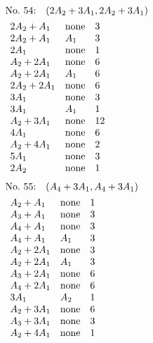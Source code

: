 \begin{align*}
&\hbox to 4cm {\textrm{No.~54:}\quad$(2A_{2}+3A_{1}, 2A_{2}+3A_{1})$\hss}\\ 
&\begin{array}{lll}
2A_{2}+A_{1} & \none & 3\\
2A_{2}+A_{1} & A_{1} & 3\\
2A_{1} & \none & 1\\
A_{2}+2A_{1} & \none & 6\\
A_{2}+2A_{1} & A_{1} & 6\\
2A_{2}+2A_{1} & \none & 6\\
3A_{1} & \none & 3\\
3A_{1} & A_{1} & 1\\
A_{2}+3A_{1} & \none & 12\\
4A_{1} & \none & 6\\
A_{2}+4A_{1} & \none & 2\\
5A_{1} & \none & 3\\
2A_{2} & \none & 1\\
\end{array}
\end{align*}
%
%
\begin{align*}
&\hbox to 4cm {\textrm{No.~55:}\quad$(A_{4}+3A_{1}, A_{4}+3A_{1})$\hss}\\ 
&\begin{array}{lll}
A_{2}+A_{1} & \none & 1\\
A_{3}+A_{1} & \none & 3\\
A_{4}+A_{1} & \none & 3\\
A_{4}+A_{1} & A_{1} & 3\\
A_{2}+2A_{1} & \none & 3\\
A_{2}+2A_{1} & A_{1} & 3\\
A_{3}+2A_{1} & \none & 6\\
A_{4}+2A_{1} & \none & 6\\
3A_{1} & A_{2} & 1\\
A_{2}+3A_{1} & \none & 6\\
A_{3}+3A_{1} & \none & 3\\
A_{2}+4A_{1} & \none & 1\\
\end{array}
\end{align*}
%
%
